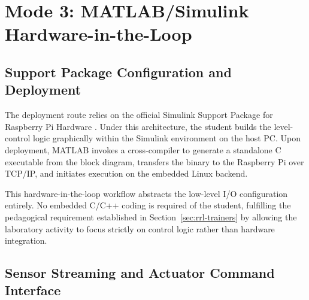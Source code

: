 \section{Mode 3: MATLAB/Simulink Hardware-in-the-Loop}
\label{sec:proc-mode3}

\subsection{Support Package Configuration and Deployment}
\label{subsec:proc-deploy}


The deployment route relies on the official Simulink Support Package for Raspberry Pi Hardware \citep{mathworks2026}. Under this architecture, the student builds the level-control logic graphically within the Simulink environment on the host PC. Upon deployment, MATLAB invokes a cross-compiler to generate a standalone C executable from the block diagram, transfers the binary to the Raspberry Pi over TCP/IP, and initiates execution on the embedded Linux backend.

This hardware-in-the-loop workflow abstracts the low-level I/O configuration entirely. No embedded C/C++ coding is required of the student, fulfilling the pedagogical requirement established in Section~\ref{sec:rrl-trainers} by allowing the laboratory activity to focus strictly on control logic rather than hardware integration.

\subsection{Sensor Streaming and Actuator Command Interface}
\label{subsec:proc-interface}

